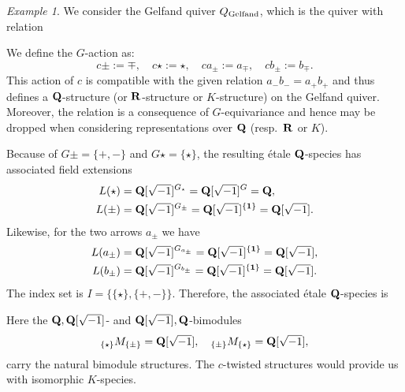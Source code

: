 \documentclass[a4paper,12pt,reqno]{amsart}
\newcommand{\RR}{{\rm\bf R}}
\newcommand{\QQ}{{\rm\bf Q}}
\theoremstyle{plain}
\theoremstyle{remark}
\newtheorem{example}[theorem]{Example}
\begin{document}
  \begin{example}\label{ex:gelfand}
    We consider the Gelfand quiver $Q_{\rm Gelfand}$, which is the quiver with relation
    \begin{center}
    \end{center}
    We define the $G$-action as:
    \[
    c\pm :=\mp,\quad c\star := \star,\quad c a_{\pm}:=a_{\mp},\quad cb_{\pm}:=b_{\mp}.
    \]
    This action of $c$ is compatible with the given relation $a_{-} b_{-} = a_{+} b_{+}$ and thus defines a $\QQ$-structure (or $\RR$-structure or $K$-structure) on the Gelfand quiver. Moreover, the relation is a consequence of $G$-equivariance and hence may be dropped when considering representations over $\QQ$ (resp.\ $\RR$ or $K$).

    Because of $G\pm=\{+,-\}$ and $G\star = \{\star\}$, the resulting \'etale $\QQ$-species has associated field extensions
    \begin{align*}
    L(\star)&=\QQ[\sqrt{-1}]^{G_\star}=\QQ[\sqrt{-1}]^{G}=\QQ,\\
    L(\pm)&=\QQ[\sqrt{-1}]^{G_{\pm}}=\QQ[\sqrt{-1}]^{\{\bf1\}}=\QQ[\sqrt{-1}].
    \end{align*}
    Likewise, for the two arrows $a_\pm$ we have
    \begin{align*}
    L(a_\pm)&=\QQ[\sqrt{-1}]^{G_{a_\pm}}=\QQ[\sqrt{-1}]^{\{\bf1\}}=\QQ[\sqrt{-1}],\\
    L(b_\pm)&=\QQ[\sqrt{-1}]^{G_{b_\pm}}=\QQ[\sqrt{-1}]^{\{\bf1\}}=\QQ[\sqrt{-1}].
    \end{align*}
    The index set is $I=\{\{\star\},\{+,-\}\}$. Therefore, the associated \'etale $\QQ$-species is
    \begin{center}
    \end{center}
    Here the $\QQ,\QQ[\sqrt{-1}]$- and $\QQ[\sqrt{-1}],\QQ$-bimodules
    \[
      {}_{\{\star\}}M_{\{\pm\}}=\QQ[\sqrt{-1}],\quad
      {}_{\{\pm\}}M_{\{\star\}}=\QQ[\sqrt{-1}],
    \]
    carry the natural bimodule structures. The $c$-twisted structures would provide us with isomorphic $K$-species.


\end{example}
\end{document}
